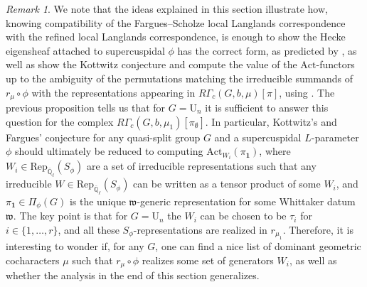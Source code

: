 \documentclass[reqno,11pt]{amsart}
\theoremstyle{remark}
\newtheorem{remark}[theorem]{Remark}
\newcommand{\U}{\mathrm{U}}
\newcommand{\mf}{\mathfrak}
\newcommand{\Act}{\mathrm{Act}}
\newcommand{\Rep}{\mathrm{Rep}}
\def\ol{\overline}
\begin{document}
\begin{remark}
We note that the ideas explained in this section illustrate how, knowing compatibility of the Fargues--Scholze local Langlands correspondence with the refined local Langlands correspondence, is enough to show the Hecke eigensheaf attached to supercuspidal $\phi$ has the correct form, as predicted by \cite[Conjecture~4.13]{Fa}, as well as show the Kottwitz conjecture and compute the value of the $\Act$-functors up to the ambiguity of the permutations matching the irreducible summands of $r_{\mu} \circ \phi$ with the representations appearing in $R\Gamma_{c}(G,b,\mu)[\pi]$, using \cite[Theorem~1.0.2]{HKW}. The previous proposition tells us that for $G = \U_{n}$ it is sufficient to answer this question for the complex $R\Gamma_{c}(G,b,\mu_{1})[\pi_{\emptyset}]$. In particular, Kottwitz's and Fargues' conjecture for any quasi-split group $G$ and a supercuspidal $L$-parameter $\phi$ should ultimately be reduced to computing $\Act_{W_{i}}(\pi_{\mathbf{1}})$, where $W_{i} \in \Rep_{\ol{\mathbb{Q}}_{\ell}}(S_{\phi})$ are a set of irreducible representations such that any irreducible $W \in \Rep_{\ol{\mathbb{Q}}_{\ell}}(S_{\phi})$ can be written as a tensor product of some $W_{i}$, and $\pi_{\mathbf{1}} \in \Pi_{\phi}(G)$ is the unique $\mf{w}$-generic representation for some Whittaker datum $\mf{w}$. The key point is that for $G = \U_{n}$ the $W_{i}$ can be chosen to be $\tau_{i}$ for $i \in \{1,\ldots,r\}$, and all these $S_{\phi}$-representations are realized in $r_{\mu_{1}}$. Therefore, it is interesting to wonder if, for any $G$, one can find a nice list of dominant geometric cocharacters $\mu$ such that $r_{\mu} \circ \phi$ realizes some set of generators $W_{i}$, as well as whether the analysis in the end of this section generalizes.
\end{remark}


\end{document}

